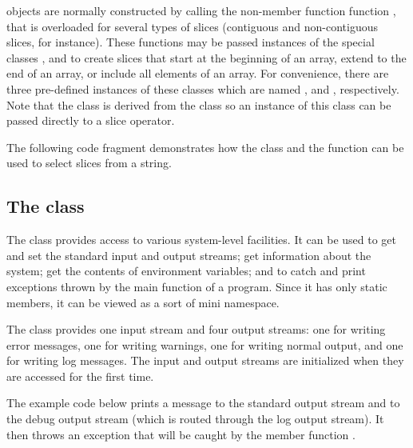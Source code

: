  objects are normally constructed by calling the non-member
function function , that is overloaded for several types of
slices (contiguous and non-contiguous slices, for instance). These
functions may be passed instances of the special classes
,  and  to create slices that start at
the beginning of an array, extend to the end of an array, or include all
elements of an array. For convenience, there are three pre-defined
instances of these classes which are named ,  and
, respectively. Note that the class  is derived from
the  class so an instance of this class can be passed
directly to a slice operator.

The following code fragment demonstrates how the  class and
the  function can be used to select slices from a
string.



\subsection*{The  class}

The  class provides access to various system-level
facilities. It can be used to get and set the standard input and output
streams; get information about the system; get the contents of
environment variables; and to catch and print exceptions thrown by
the main function of a program. Since it has only static members, it can
be viewed as a sort of mini namespace.

The  class provides one input stream and four output
streams: one for writing error messages, one for writing warnings, one
for writing normal output, and one for writing log messages. The input
and output streams are initialized when they are accessed for the first
time.

The example code below prints a message to the standard output stream and
to the debug output stream (which is routed through the log output
stream). It then throws an exception that will be caught by the member
function .




